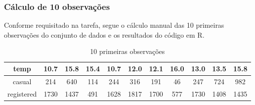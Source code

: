 \documentclass[a4paper, 12pt, titlepage]{article}
\begin{document}

\subsubsection*{Cálculo de 10 observações}
Conforme requisitado na tarefa, segue o cálculo manual das 10 primeiras observações do conjunto de dados e os resultados do código em R.

    \begin{table}[h!]
        \centering
        \caption{10 primeiras observações}
        \label{tab:mascara_2u}
        \begin{tabular}{|c|c|c|c|c|c|c|c|c|c|c|}
            \hline
            temp &10.7 &15.8 &15.4 &10.7 &12.0 &12.1& 16.0&13.0 &13.5 &15.8 \\ \hline
            casual &214 &640 &114 &244 &316 &191 &46 &247 &724 &982 \\ \hline
            registered &1730 &1437 &491 &1628 &1817 &1700 &577 &1730 &1408 &1435 \\
            \hline
        \end{tabular}
    \end{table}
\end{document}
